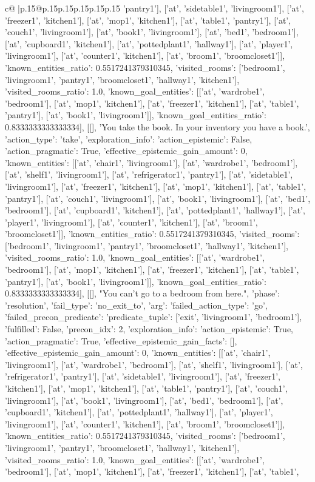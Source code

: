 \documentclass{article}
\begin{document}
{\begin{supertabular}{c@{$\;$}|p{.15\linewidth}@{}p{.15\linewidth}p{.15\linewidth}p{.15\linewidth}p{.15\linewidth}p{.15\linewidth}}
{{{'pantry1'], ['at', 'sidetable1', 'livingroom1'], ['at', 'freezer1', 'kitchen1'], ['at', 'mop1', 'kitchen1'], ['at', 'table1', 'pantry1'], ['at', 'couch1', 'livingroom1'], ['at', 'book1', 'livingroom1'], ['at', 'bed1', 'bedroom1'], ['at', 'cupboard1', 'kitchen1'], ['at', 'pottedplant1', 'hallway1'], ['at', 'player1', 'livingroom1'], ['at', 'counter1', 'kitchen1'], ['at', 'broom1', 'broomcloset1']], 'known_entities_ratio': 0.5517241379310345, 'visited_rooms': ['bedroom1', 'livingroom1', 'pantry1', 'broomcloset1', 'hallway1', 'kitchen1'], 'visited_rooms_ratio': 1.0, 'known_goal_entities': [['at', 'wardrobe1', 'bedroom1'], ['at', 'mop1', 'kitchen1'], ['at', 'freezer1', 'kitchen1'], ['at', 'table1', 'pantry1'], ['at', 'book1', 'livingroom1']], 'known_goal_entities_ratio': 0.8333333333333334}}], [[], 'You take the book. In your inventory you have a book.', {'action_type': 'take', 'exploration_info': {'action_epistemic': False, 'action_pragmatic': True, 'effective_epistemic_gain_amount': 0, 'known_entities': [['at', 'chair1', 'livingroom1'], ['at', 'wardrobe1', 'bedroom1'], ['at', 'shelf1', 'livingroom1'], ['at', 'refrigerator1', 'pantry1'], ['at', 'sidetable1', 'livingroom1'], ['at', 'freezer1', 'kitchen1'], ['at', 'mop1', 'kitchen1'], ['at', 'table1', 'pantry1'], ['at', 'couch1', 'livingroom1'], ['at', 'book1', 'livingroom1'], ['at', 'bed1', 'bedroom1'], ['at', 'cupboard1', 'kitchen1'], ['at', 'pottedplant1', 'hallway1'], ['at', 'player1', 'livingroom1'], ['at', 'counter1', 'kitchen1'], ['at', 'broom1', 'broomcloset1']], 'known_entities_ratio': 0.5517241379310345, 'visited_rooms': ['bedroom1', 'livingroom1', 'pantry1', 'broomcloset1', 'hallway1', 'kitchen1'], 'visited_rooms_ratio': 1.0, 'known_goal_entities': [['at', 'wardrobe1', 'bedroom1'], ['at', 'mop1', 'kitchen1'], ['at', 'freezer1', 'kitchen1'], ['at', 'table1', 'pantry1'], ['at', 'book1', 'livingroom1']], 'known_goal_entities_ratio': 0.8333333333333334}}], [[], "You can't go to a bedroom from here.", {'phase': 'resolution', 'fail_type': 'no_exit_to', 'arg': {'failed_action_type': 'go', 'failed_precon_predicate': {'predicate_tuple': ['exit', 'livingroom1', 'bedroom1'], 'fulfilled': False, 'precon_idx': 2}}, 'exploration_info': {'action_epistemic': True, 'action_pragmatic': True, 'effective_epistemic_gain_facts': [], 'effective_epistemic_gain_amount': 0, 'known_entities': [['at', 'chair1', 'livingroom1'], ['at', 'wardrobe1', 'bedroom1'], ['at', 'shelf1', 'livingroom1'], ['at', 'refrigerator1', 'pantry1'], ['at', 'sidetable1', 'livingroom1'], ['at', 'freezer1', 'kitchen1'], ['at', 'mop1', 'kitchen1'], ['at', 'table1', 'pantry1'], ['at', 'couch1', 'livingroom1'], ['at', 'book1', 'livingroom1'], ['at', 'bed1', 'bedroom1'], ['at', 'cupboard1', 'kitchen1'], ['at', 'pottedplant1', 'hallway1'], ['at', 'player1', 'livingroom1'], ['at', 'counter1', 'kitchen1'], ['at', 'broom1', 'broomcloset1']], 'known_entities_ratio': 0.5517241379310345, 'visited_rooms': ['bedroom1', 'livingroom1', 'pantry1', 'broomcloset1', 'hallway1', 'kitchen1'], 'visited_rooms_ratio': 1.0, 'known_goal_entities': [['at', 'wardrobe1', 'bedroom1'], ['at', 'mop1', 'kitchen1'], ['at', 'freezer1', 'kitchen1'], ['at', 'table1', }}}
\end{supertabular}}
\end{document}
